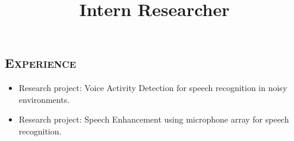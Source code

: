 \begin{resume}
\section{\textsc{Experience}}

\title{Intern Researcher}
\begin{position}
\vspace*{-8pt}
\begin{itemize}
\item Research project: Voice Activity Detection for speech recognition in noisy environments.
\vspace*{-2pt}
\item Research project: Speech Enhancement using microphone array for speech recognition.
\end{itemize} 
\end{position}





\end{resume}
